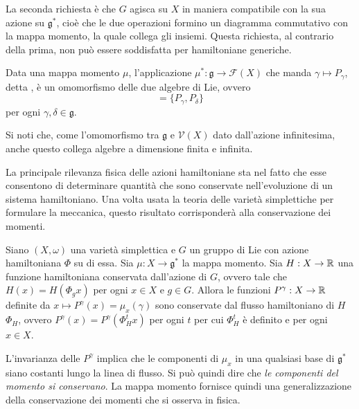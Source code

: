 \begin{remark}
  La seconda richiesta è che $G$ agisca su $X$ in maniera compatibile con la sua azione su $\mathfrak{g}^*$, cioè che le due operazioni formino un diagramma commutativo con la mappa momento, la quale collega gli insiemi. Questa richiesta, al contrario della prima, non può essere soddisfatta per hamiltoniane generiche.
\end{remark}
\begin{remark}
  Data una mappa momento $\mu$, l'applicazione $\mu^*:\mathfrak{g} \to \mathcal{F}(X)$ che manda $\gamma \mapsto P_{\gamma}$, detta , è un omomorfismo delle due algebre di Lie, ovvero 
  \begin{equation}
  [\gamma,\delta] = \{P_{\gamma}, P_{\delta}\} 
  \end{equation} 
  per ogni $\gamma,\delta \in \mathfrak{g}$.
\end{remark}
\begin{remark}
  Si noti che, come l'omomorfismo tra $\mathfrak{g}$ e $\mathcal{V}(X)$ dato dall'azione infinitesima, anche questo collega algebre a dimensione finita e infinita.
\end{remark}

La principale rilevanza fisica delle azioni hamiltoniane sta nel fatto che esse consentono di determinare quantità che sono conservate nell'evoluzione di un sistema hamiltoniano. Una volta usata la teoria delle varietà simplettiche per formulare la meccanica, questo risultato corrisponderà alla conservazione dei momenti.
\begin{theorem}
  Siano $(X,\omega)$ una varietà simplettica e $G$ un gruppo di Lie con azione hamiltoniana $\Phi$ su di essa. Sia $\mu: X\to \mathfrak{g}^*$ la mappa momento. Sia $H: X\to \mathbb{R}$ una funzione hamiltoniana conservata dall'azione di $G$, ovvero tale che $H(x) = H(\Phi_g x)$ per ogni $x \in X$ e $g \in G$. Allora le funzioni $P^{\gamma}: X\to \mathbb{R}$ definite da $x \mapsto P^{\gamma}(x) = \mu_x(\gamma)$ sono conservate dal flusso hamiltoniano di $H$ $\Phi_H$, ovvero $P^{\gamma}(x) = P^{\gamma}(\Phi^t_H x)$ per ogni $t$ per cui $\Phi^t_H$ è definito e per ogni $x \in X$.
\end{theorem}
\begin{remark}
  L'invarianza delle $P^{\gamma}$ implica che le componenti di $\mu_x$ in una qualsiasi base di $\mathfrak{g}^*$ siano costanti lungo la linea di flusso. Si può quindi dire che \emph{le componenti del momento si conservano}. La mappa momento fornisce quindi una generalizzazione della conservazione dei momenti che si osserva in fisica.
\end{remark}

